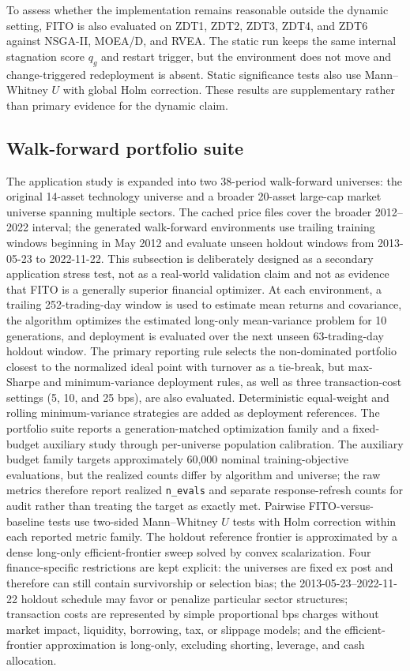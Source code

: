 \documentclass[preprint,12pt]{elsarticle}
\begin{document}
To assess whether the implementation remains reasonable outside the dynamic setting, FITO is also evaluated on ZDT1, ZDT2, ZDT3, ZDT4, and ZDT6 against NSGA-II, MOEA/D, and RVEA. The static run keeps the same internal stagnation score $q_g$ and restart trigger, but the environment does not move and change-triggered redeployment is absent. Static significance tests also use Mann--Whitney $U$ with global Holm correction. These results are supplementary rather than primary evidence for the dynamic claim.

\subsection{Walk-forward portfolio suite}

The application study is expanded into two 38-period walk-forward universes: the original 14-asset technology universe and a broader 20-asset large-cap market universe spanning multiple sectors. The cached price files cover the broader 2012--2022 interval; the generated walk-forward environments use trailing training windows beginning in May 2012 and evaluate unseen holdout windows from 2013-05-23 to 2022-11-22. This subsection is deliberately designed as a secondary application stress test, not as a real-world validation claim and not as evidence that FITO is a generally superior financial optimizer. At each environment, a trailing 252-trading-day window is used to estimate mean returns and covariance, the algorithm optimizes the estimated long-only mean-variance problem for 10 generations, and deployment is evaluated over the next unseen 63-trading-day holdout window. The primary reporting rule selects the non-dominated portfolio closest to the normalized ideal point with turnover as a tie-break, but max-Sharpe and minimum-variance deployment rules, as well as three transaction-cost settings (5, 10, and 25 bps), are also evaluated. Deterministic equal-weight and rolling minimum-variance strategies are added as deployment references. The portfolio suite reports a generation-matched optimization family and a fixed-budget auxiliary study through per-universe population calibration. The auxiliary budget family targets approximately 60,000 nominal training-objective evaluations, but the realized counts differ by algorithm and universe; the raw metrics therefore report realized \texttt{n\_evals} and separate response-refresh counts for audit rather than treating the target as exactly met. Pairwise FITO-versus-baseline tests use two-sided Mann--Whitney $U$ tests with Holm correction within each reported metric family. The holdout reference frontier is approximated by a dense long-only efficient-frontier sweep solved by convex scalarization. Four finance-specific restrictions are kept explicit: the universes are fixed ex post and therefore can still contain survivorship or selection bias; the 2013-05-23--2022-11-22 holdout schedule may favor or penalize particular sector structures; transaction costs are represented by simple proportional bps charges without market impact, liquidity, borrowing, tax, or slippage models; and the efficient-frontier approximation is long-only, excluding shorting, leverage, and cash allocation.
\end{document}
